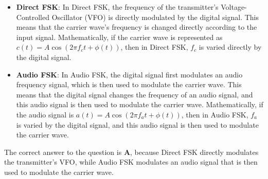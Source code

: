 \begin{itemize}
    \item \textbf{Direct FSK}: In Direct FSK, the frequency of the transmitter's Voltage-Controlled Oscillator (VFO) is directly modulated by the digital signal. This means that the carrier wave's frequency is changed directly according to the input signal. Mathematically, if the carrier wave is represented as \( c(t) = A \cos(2\pi f_c t + \phi(t)) \), then in Direct FSK, \( f_c \) is varied directly by the digital signal.

    \item \textbf{Audio FSK}: In Audio FSK, the digital signal first modulates an audio frequency signal, which is then used to modulate the carrier wave. This means that the digital signal changes the frequency of an audio signal, and this audio signal is then used to modulate the carrier wave. Mathematically, if the audio signal is \( a(t) = A \cos(2\pi f_a t + \phi(t)) \), then in Audio FSK, \( f_a \) is varied by the digital signal, and this audio signal is then used to modulate the carrier wave.
\end{itemize}

The correct answer to the question is \textbf{A}, because Direct FSK directly modulates the transmitter's VFO, while Audio FSK modulates an audio signal that is then used to modulate the carrier wave.

